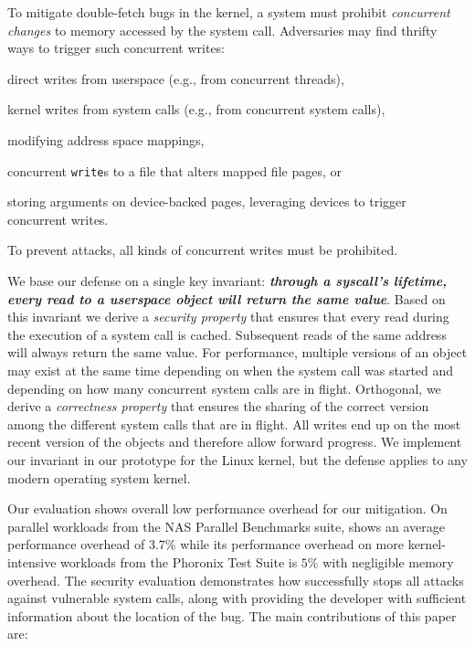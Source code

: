 \documentclass[letterpaper,twocolumn,10pt, anonymous]{article}
\begin{document}
To mitigate double-fetch bugs in the kernel, a system must prohibit
\emph{concurrent changes} to memory accessed by the system call. Adversaries may
find thrifty ways to trigger such concurrent writes:
\begin{inparaenum}
\item  direct writes from userspace (e.g., from concurrent threads),
\item  kernel writes from system calls (e.g., from concurrent system calls),
\item  modifying address space mappings,
\item  concurrent \texttt{write}s to a file that alters mapped
file pages, or
\item  storing arguments on device-backed pages, leveraging devices to trigger
concurrent writes.
\end{inparaenum}
To prevent attacks, all kinds of concurrent writes must be prohibited.

We base our defense on a single key invariant: 
\textbf{\emph{through a syscall's lifetime, every read to a userspace object 
will return the same value}}. Based on this invariant we derive a \emph{security
property} that ensures that every read during the execution of a system call is
cached. Subsequent reads of the same address will always return the same value.
For performance, multiple versions of an object may exist at the same time
depending on when the system call was started and depending on how many
concurrent system calls are in flight. Orthogonal, we derive a \emph{correctness
property} that ensures the sharing of the correct version among the different
system calls that are in flight. All writes end up on the most recent version of
the objects and therefore allow forward progress.
We implement our invariant in our \tiktok prototype for the Linux kernel, but
the defense applies to any modern operating system kernel.

Our evaluation shows overall low performance overhead for our mitigation.
On parallel workloads from the NAS Parallel Benchmarks suite, \tiktok shows 
an average performance overhead of $3.7\%$ while its performance overhead on
more kernel-intensive workloads from the Phoronix Test Suite is $5\%$ with 
negligible memory overhead.
The security evaluation demonstrates how \tiktok successfully stops all attacks
against vulnerable system calls, along with providing the developer with
sufficient information about the location of the bug.
%
The main contributions of this paper are:
\end{document}
